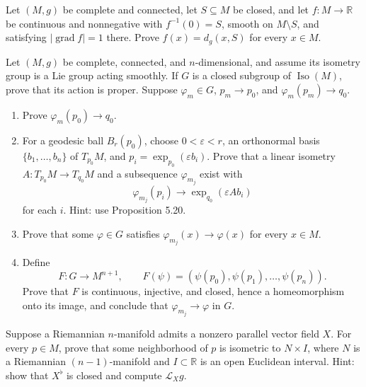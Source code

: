 \begin{exercise}
\label{prob:smooth-function-equals-distance}

Let $(M,g)$ be complete and connected, let $S\subseteq M$ be closed, and let
$f:M\to\mathbb R$ be continuous and nonnegative with $f^{-1}(0)=S$, smooth on
$M\setminus S$, and satisfying $|\operatorname{grad}f|=1$ there.  Prove
$f(x)=d_g(x,S)$ for every $x\in M$.
\end{exercise}

\begin{exercise}
\label{prob:isometry-group-acts-properly}

Let $(M,g)$ be complete, connected, and $n$-dimensional, and assume its
isometry group is a Lie group acting smoothly.  If $G$ is a closed subgroup of
$\operatorname{Iso}(M)$, prove that its action is proper.  Suppose
$\varphi_m\in G$, $p_m\to p_0$, and $\varphi_m(p_m)\to q_0$.
\begin{enumerate}
\item[(a)] Prove $\varphi_m(p_0)\to q_0$.
\item[(b)] For a geodesic ball $B_r(p_0)$, choose $0<\varepsilon<r$, an
orthonormal basis $\{b_1,\ldots,b_n\}$ of $T_{p_0}M$, and
$p_i=\exp_{p_0}(\varepsilon b_i)$.  Prove that a linear isometry
$A:T_{p_0}M\to T_{q_0}M$ and a subsequence $\varphi_{m_j}$ exist with
\[
\varphi_{m_j}(p_i)\to\exp_{q_0}(\varepsilon A b_i)
\]
for each $i$.  Hint: use Proposition 5.20.
\item[(c)] Prove that some $\varphi\in G$ satisfies
$\varphi_{m_j}(x)\to\varphi(x)$ for every $x\in M$.
\item[(d)] Define
\[
F:G\to M^{n+1},\qquad F(\psi)=(\psi(p_0),\psi(p_1),\ldots,\psi(p_n)).
\]
Prove that $F$ is continuous, injective, and closed, hence a homeomorphism
onto its image, and conclude that $\varphi_{m_j}\to\varphi$ in $G$.
\end{enumerate}
\end{exercise}

\begin{exercise}
\label{prob:parallel-vector-field}

Suppose a Riemannian $n$-manifold admits a nonzero parallel vector field $X$.
For every $p\in M$, prove that some neighborhood of $p$ is isometric to
$N\times I$, where $N$ is a Riemannian $(n-1)$-manifold and $I\subset\mathbb R$
is an open Euclidean interval.  Hint: show that $X^\flat$ is closed and
compute $\mathcal L_Xg$.
\end{exercise}

